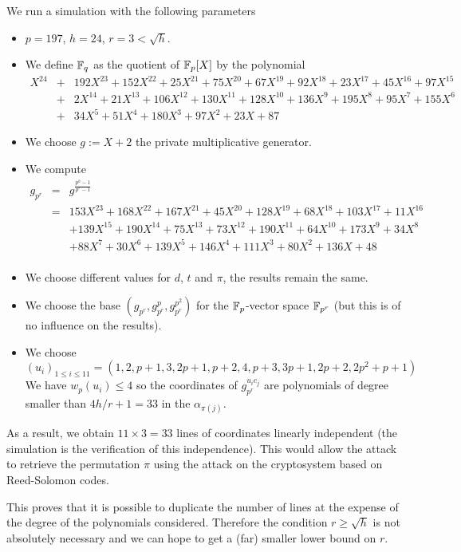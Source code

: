 \documentclass[12pt,a4paper,titlepage]{article}
\begin{document}
We run a simulation with the following parameters
\begin{itemize}
\item $p = 197$, $h = 24$, $r = 3 < \sqrt{h}$.
\item We define $\mathbb{F}_q$ as the quotient of $\mathbb{F}_p[X]$ by the polynomial
\begin{eqnarray*}
X^{24} &+& 192X^{23} + 152X^{22} + 25X^{21} + 75X^{20} + 67X^{19} + 92X^{18} + 23X^{17} + 45X^{16} + 97X^{15} \\
 &+& 2X^{14} + 21X^{13} + 106X^{12} + 130X^{11} + 128X^{10} + 136X^9 + 195X^8 + 95X^7 + 155X^6 \\
 &+& 34X^5 + 51X^4 + 180X^3 + 97X^2 + 23X + 87
\end{eqnarray*}
\item We choose $g := X + 2$ the private multiplicative generator.
\item We compute
\begin{eqnarray*}
g_{p^r} &=& g^{\frac{p^h-1}{p^r-1}} \\
&=& 153X^{23} + 168X^{22} + 167X^{21} + 45X^{20} + 128X^{19} + 68X^{18} + 103X^{17} + 11X^{16}\\
&&+ 139X^{15} + 190X^{14} + 75X^{13} + 73X^{12} + 190X^{11} + 64X^{10} + 173X^9 + 34X^8 \\
&&+ 88X^7 + 30X^6 + 139X^5 + 146X^4 + 111X^3 + 80X^2 + 136X + 48\\
\end{eqnarray*}
\item We choose different values for $d$, $t$ and $\pi$, the results remain the same.
\item We choose the base $\left(g_{p^r}, g_{p^r}^p, g_{p^r}^{p^2} \right)$ for the $\mathbb{F}_p$-vector space $\mathbb{F}_{p^r}$ (but this is of no influence on the results).
\item We choose $(u_i)_{1\leq  i \leq 11} = (1,2,p+1,3,2p+1,p+2,4,p+3,3p+1,2p+2,2p^2+p+1)$\\
We have $w_p(u_i) \leq 4$ so the coordinates of $g_{p^r}^{u_i c_j}$ are polynomials of degree smaller than $4 h/r+1 = 33$ in the $\alpha_{\pi(j)}$.
\end{itemize}
As a result, we obtain $11 \times 3 = 33$ lines of coordinates linearly independent (the simulation is the verification of this independence). This would allow the attack to retrieve the permutation $\pi$ using the attack on the cryptosystem based on Reed-Solomon codes.

This proves that it is possible to duplicate the number of lines at the expense of the degree of the polynomials considered. Therefore the condition $r \geq \sqrt{h}$ is not absolutely necessary and we can hope to get a (far) smaller lower bound on $r$.
\end{document}

